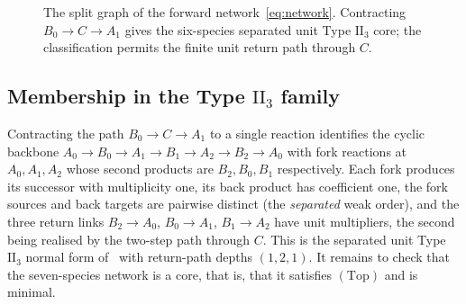 \documentclass[11pt,a4paper]{article}
\theoremstyle{plain}
\theoremstyle{definition}
\theoremstyle{remark}
\numberwithin{equation}{section}
\newcommand{\II}{\mathrm{II}}
\newcommand{\Top}{\mathrm{(Top)}}
\begin{document}
\begin{figure}[t]
\centering
{}
\caption{The split graph of the forward network~\eqref{eq:network}. Contracting $B_0\to C\to A_1$ gives the six-species separated unit Type $\mathrm{II}_3$ core; the classification permits the finite unit return path through $C$.}
\label{fig:network}
\end{figure}

\subsection{Membership in the Type \texorpdfstring{$\II_3$}{II\_3} family}
Contracting the path $B_0\to C\to A_1$ to a single reaction identifies the cyclic backbone $A_0\to B_0\to A_1\to B_1\to A_2\to B_2\to A_0$ with fork reactions at $A_0,A_1,A_2$ whose second products are $B_2,B_0,B_1$ respectively. Each fork produces its successor with multiplicity one, its back product has coefficient one, the fork sources and back targets are pairwise distinct (the \emph{separated} weak order), and the three return links $B_2\to A_0$, $B_0\to A_1$, $B_1\to A_2$ have unit multipliers, the second being realised by the two-step path through $C$. This is the separated unit Type $\II_3$ normal form of~\cite{TypeIIpos,TypeIImixed} with return-path depths $(1,2,1)$. It remains to check that the seven-species network is a core, that is, that it satisfies $\Top$ and is minimal.
\end{document}
